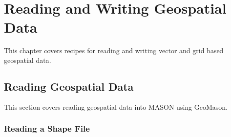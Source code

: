 \documentclass[twoside,10pt]{book}
\begin{document}
\chapter{Reading and Writing Geospatial Data}
\label{ch:io}

This chapter covers recipes for reading and writing vector and grid based geospatial data.

\section{Reading Geospatial Data}
\label{sec:readingdata}
This section covers reading geospatial data into MASON using GeoMason.

\subsection{Reading a Shape File}
\label{sub:readingshapefiles}
\end{document}
